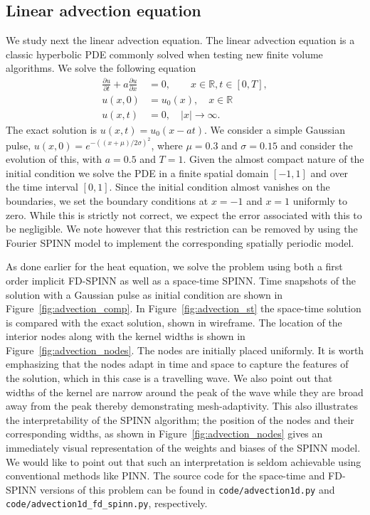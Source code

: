 \documentclass[12pt]{article}
\begin{document}
\subsection{Linear advection equation}
We study next the linear advection equation. The linear advection equation is a classic hyperbolic PDE commonly solved when testing new finite volume algorithms.  We solve the following equation
\begin{displaymath}
\begin{split}
\frac{\partial u}{\partial t} + a \frac{\partial u}{\partial x} &= 0, \quad \quad x \in \mathbb{R}, t \in [0, T],\\
u(x, 0) &= u_0(x), \quad x \in \mathbb{R}\\
u(x, t) &= 0 , \quad |x| \rightarrow \infty.
\end{split}
\end{displaymath}
The exact solution is $u(x, t) = u_0(x - at)$.  We consider a simple Gaussian pulse, $u(x, 0) = e^{-((x + \mu)/2 \sigma)^2}$, where $\mu = 0.3$ and $\sigma=0.15$ and consider the evolution of this, with $a=0.5$ and $T=1$.  Given the almost compact nature of the initial condition we solve the PDE in a finite spatial domain $[-1, 1]$ and over the time interval $[0, 1]$.  Since the initial condition almost vanishes on the boundaries, we set the boundary conditions at $x= -1$ and $x=1$ uniformly to zero.  While this is strictly not correct, we expect the error associated with this to be negligible.  We note however that this restriction can be removed by using the Fourier SPINN model to implement the corresponding spatially periodic model.

As done earlier for the heat equation, we solve the problem using both a first order implicit FD-SPINN as well as a space-time SPINN.  Time snapshots of the solution with a Gaussian pulse as initial condition are shown in Figure~\ref{fig:advection_comp}.  In Figure~\ref{fig:advection_st} the space-time solution is compared with the exact solution, shown in wireframe.  The location of the interior nodes along with the kernel widths is shown in Figure~\ref{fig:advection_nodes}.  The nodes are initially placed uniformly. It is worth emphasizing that the nodes adapt in time and space to capture the features of the solution, which in this case is a travelling wave. We also point out that widths of the kernel are narrow around the peak of the wave while they are broad away from the peak thereby demonstrating mesh-adaptivity. This also illustrates the interpretability of the SPINN algorithm; the position of the nodes and their corresponding widths, as shown in Figure~\ref{fig:advection_nodes} gives an immediately visual representation of the weights and biases of the SPINN model. We would like to point out that such an interpretation is seldom achievable using conventional methods like PINN. The source code for the space-time and FD-SPINN versions of this problem can be found in \verb|code/advection1d.py| and \verb|code/advection1d_fd_spinn.py|, respectively.
\end{document}
